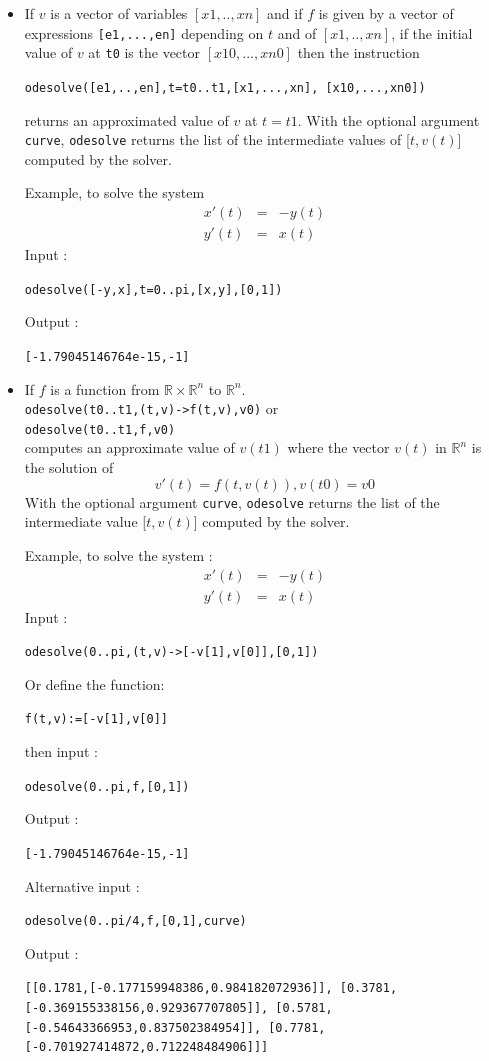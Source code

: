 \documentclass[a4paper,11pt]{book}
\begin{document}
\begin{itemize}
\item If $v$ is a vector
of variables $[x1,..,xn]$ and if $f$ is given by a vector  of expressions
{\tt [e1,...,en]} depending on $t$ and of $[x1,..,xn]$,
if the  initial value of $v$ at {\tt t0}
is the vector $[x10,...,xn0]$ then the instruction
\begin{center}
{\tt odesolve([e1,..,en],t=t0..t1,[x1,...,xn],
[x10,...,xn0])} 
\end{center}
returns an approximated value of $v$ at $t=t1$.
With the optional argument {\tt curve}, {\tt odesolve} returns the list of 
the intermediate values of [$t,v(t)$] computed by the solver. 

Example, to solve the system
\begin{eqnarray*}
x'(t) &=&-y(t)\\
y'(t)&=&x(t)
\end{eqnarray*}
Input :
\begin{center}
{\tt odesolve([-y,x],t=0..pi,[x,y],[0,1])}\end{center}
Output :
\begin{center}{\tt  [-1.79045146764e-15,-1]}\end{center}

\item  If $f$ is a function from $\mathbb R \times \mathbb R^n$ to 
$\mathbb R^n$.\\
{\tt odesolve(t0..t1,(t,v)->f(t,v),v0)} or\\
{\tt odesolve(t0..t1,f,v0)}\\
computes an approximate value of $v(t1)$ where the vector $v(t)$
in $\mathbb R^n$ is the solution of
\[ v'(t)=f(t,v(t)), v(t0)=v0 \]
With the optional argument {\tt curve}, {\tt odesolve} returns the list of 
the intermediate value [$t,v(t)$] computed by the solver.

Example, to solve the system :\\
\begin{eqnarray*}
x'(t) &=&-y(t)\\
y'(t)&=&x(t)
\end{eqnarray*}
Input :
\begin{center}{\tt odesolve(0..pi,(t,v)->[-v[1],v[0]],[0,1])}\end{center}
Or define the function:
\begin{center}{\tt f(t,v):=[-v[1],v[0]]}\end{center}
then input : 
\begin{center}{\tt odesolve(0..pi,f,[0,1])}\end{center}
Output :
\begin{center}{\tt  [-1.79045146764e-15,-1]}\end{center}
Alternative input :
\begin{center}{\tt odesolve(0..pi/4,f,[0,1],curve)}\end{center}
Output :
\begin{center}{\tt  [[0.1781,[-0.177159948386,0.984182072936]], [0.3781,[-0.369155338156,0.929367707805]], [0.5781,[-0.54643366953,0.837502384954]], [0.7781,[-0.701927414872,0.712248484906]]]}\end{center}
\end{itemize}
\end{document}

